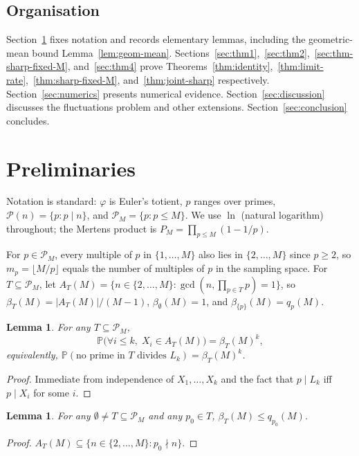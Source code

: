 \documentclass[11pt]{article}
\newtheorem{lemma}[theorem]{Lemma}
\theoremstyle{remark}
\newcommand{\gcdop}{\operatorname{gcd}}
\newcommand{\PP}{\mathbb{P}}
\newcommand{\PM}{\mathcal{P}_M}
\begin{document}
\subsection{Organisation}
Section~\ref{sec:prelim} fixes notation and records elementary lemmas, including the geometric-mean bound Lemma~\ref{lem:geom-mean}. Sections~\ref{sec:thm1},~\ref{sec:thm2},~\ref{sec:thm-sharp-fixed-M}, and~\ref{sec:thm4} prove Theorems~\ref{thm:identity},~\ref{thm:limit-rate},~\ref{thm:sharp-fixed-M}, and~\ref{thm:joint-sharp} respectively. Section~\ref{sec:numerics} presents numerical evidence. Section~\ref{sec:discussion} discusses the fluctuations problem and other extensions. Section~\ref{sec:conclusion} concludes.

\section{Preliminaries}\label{sec:prelim}

Notation is standard: $\varphi$ is Euler's totient, $p$ ranges over primes, $\mathcal{P}(n) = \{p : p \mid n\}$, and $\PM = \{p : p \leq M\}$. We use $\ln$ (natural logarithm) throughout; the Mertens product is $P_M = \prod_{p \leq M}(1 - 1/p)$.

For $p \in \PM$, every multiple of $p$ in $\{1, \ldots, M\}$ also lies in $\{2, \ldots, M\}$ since $p \geq 2$, so $m_p = \lfloor M/p \rfloor$ equals the number of multiples of $p$ in the sampling space. For $T \subseteq \PM$, let $A_T(M) = \{n \in \{2, \ldots, M\} : \gcdop(n, \prod_{p \in T} p) = 1\}$, so $\beta_T(M) = |A_T(M)|/(M-1)$, $\beta_\emptyset(M) = 1$, and $\beta_{\{p\}}(M) = q_p(M)$.

\begin{lemma}\label{lem:betaT-power}
For any $T \subseteq \PM$,
\[
\PP\bigl(\forall i \leq k,\; X_i \in A_T(M)\bigr) = \beta_T(M)^k,
\]
equivalently, $\PP(\text{no prime in $T$ divides $L_k$}) = \beta_T(M)^k$.
\end{lemma}
\begin{proof}
Immediate from independence of $X_1, \ldots, X_k$ and the fact that $p \mid L_k$ iff $p \mid X_i$ for some $i$.
\end{proof}

\begin{lemma}\label{lem:single-prime}
For any $\emptyset \neq T \subseteq \PM$ and any $p_0 \in T$, $\beta_T(M) \leq q_{p_0}(M)$.
\end{lemma}
\begin{proof}
$A_T(M) \subseteq \{n \in \{2, \ldots, M\} : p_0 \nmid n\}$.
\end{proof}
\end{document}
